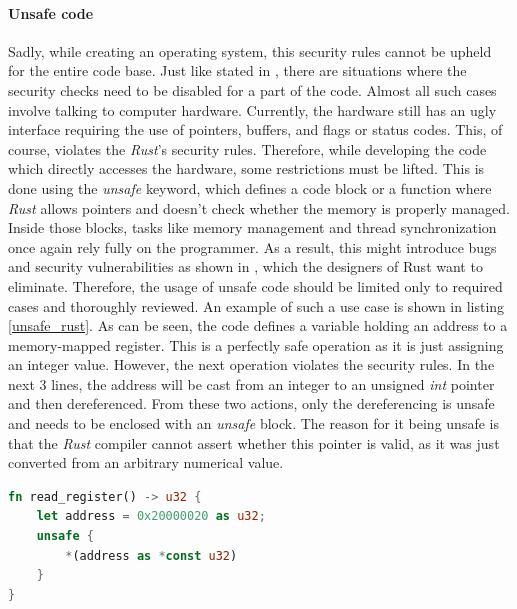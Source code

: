 \paragraph{Unsafe code}
Sadly, while creating an operating system, this security rules cannot be upheld for the entire code base. Just like stated in \cite{rusthowunsafe}, there are situations where the security checks need to be disabled for a part of the code. Almost all such cases involve talking to computer hardware. Currently, the hardware still has an ugly interface requiring the use of pointers, buffers, and flags or status codes. This, of course, violates the \textit{Rust}'s security rules. Therefore, while developing the code which directly accesses the hardware, some restrictions must be lifted. This is done using the \textit{unsafe} keyword, which defines a code block or a function where \textit{Rust} allows pointers and doesn't check whether the memory is properly managed. Inside those blocks, tasks like memory management and thread synchronization once again rely fully on the programmer. As a result, this might introduce bugs and security vulnerabilities as shown in \cite{rustunsafeissues}, which the designers of Rust want to eliminate. Therefore, the usage of unsafe code should be limited only to required cases and thoroughly reviewed. An example of such a use case is shown in listing \ref{unsafe_rust}. As can be seen, the code defines a variable holding an address to a memory-mapped register. This is a perfectly safe operation as it is just assigning an integer value. However, the next operation violates the security rules. In the next 3 lines, the address will be cast from an integer to an unsigned \textit{int} pointer and then dereferenced. From these two actions, only the dereferencing is unsafe and needs to be enclosed with an \textit{unsafe} block. The reason for it being unsafe is that the \textit{Rust} compiler cannot assert whether this pointer is valid, as it was just converted from an arbitrary numerical value. 

\begin{minipage}{.9\textwidth}
    \begin{lstlisting}[language=rust,caption={Unsafe code example.},captionpos=b,label={unsafe_rust}]
fn read_register() -> u32 {
    let address = 0x20000020 as u32;
    unsafe {
        *(address as *const u32)
    }
}        
    \end{lstlisting}    
\end{minipage}

